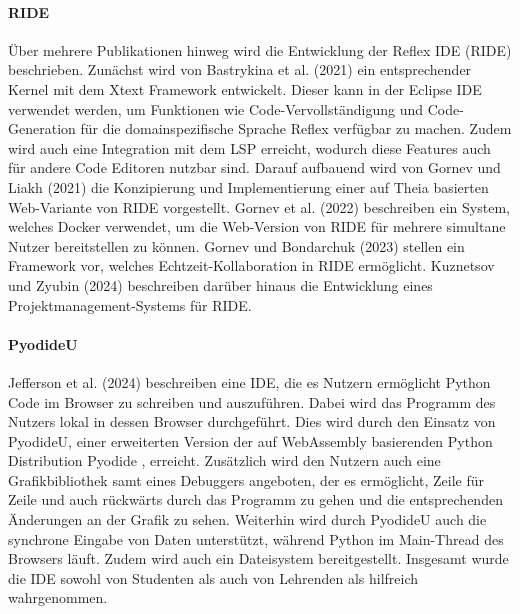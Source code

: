 \paragraph{RIDE}
Über mehrere Publikationen hinweg wird die Entwicklung der Reflex IDE (RIDE) beschrieben. Zunächst wird von Bastrykina et al. (2021) \cite{bastrykina_developing_2021} ein entsprechender Kernel mit dem Xtext Framework \cite{noauthor_xtext_nodate} entwickelt. Dieser kann in der Eclipse IDE verwendet werden, um Funktionen wie Code-Vervollständigung und Code-Generation für die domainspezifische Sprache Reflex verfügbar zu machen. Zudem wird auch eine Integration mit dem \ac{LSP} \cite{noauthor_language-server-protocol_nodate} erreicht, wodurch diese Features auch für andere Code Editoren nutzbar sind. Darauf aufbauend wird von Gornev und Liakh (2021) \cite{gornev_ride_2021} die Konzipierung und Implementierung einer auf Theia basierten Web-Variante von RIDE vorgestellt. Gornev et al. (2022) \cite{gornev_towards_2022} beschreiben ein System, welches Docker verwendet, um die Web-Version von RIDE für mehrere simultane Nutzer bereitstellen zu können. Gornev und Bondarchuk (2023) \cite{gornev_towards_2023} stellen ein Framework vor, welches Echtzeit-Kollaboration in RIDE ermöglicht. Kuznetsov und Zyubin (2024) \cite{kuznetsov_development_2024} beschreiben darüber hinaus die Entwicklung eines Projektmanagement-Systems für RIDE.

\paragraph{PyodideU}
Jefferson et al. (2024) \cite{jefferson_pyodideu_2024} beschreiben eine IDE, die es Nutzern ermöglicht Python Code im Browser zu schreiben und auszuführen. Dabei wird das Programm des Nutzers lokal in dessen Browser durchgeführt. Dies wird durch den Einsatz von PyodideU, einer erweiterten Version der auf WebAssembly basierenden Python Distribution Pyodide \cite{noauthor_pyodide_nodate}, erreicht. Zusätzlich wird den Nutzern auch eine Grafikbibliothek samt eines Debuggers angeboten, der es ermöglicht, Zeile für Zeile und auch rückwärts durch das Programm zu gehen und die entsprechenden Änderungen an der Grafik zu sehen. Weiterhin wird durch PyodideU auch die synchrone Eingabe von Daten unterstützt, während Python im Main-Thread des Browsers läuft. Zudem wird auch ein Dateisystem bereitgestellt. Insgesamt wurde die IDE sowohl von Studenten als auch von Lehrenden als hilfreich wahrgenommen.

